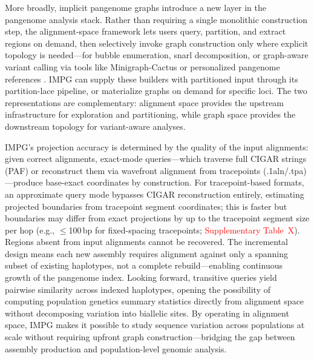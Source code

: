 
More broadly, implicit pangenome graphs introduce a new layer in the pangenome analysis stack. Rather than requiring a single monolithic construction step, the alignment-space framework lets users query, partition, and extract regions on demand, then selectively invoke graph construction only where explicit topology is needed---for bubble enumeration, snarl decomposition, or graph-aware variant calling via tools like Minigraph-Cactus \cite{Hickey2023} or personalized pangenome references \cite{Siren2024}. IMPG can supply these builders with partitioned input through its partition-lace pipeline, or materialize graphs on demand for specific loci. The two representations are complementary: alignment space provides the upstream infrastructure for exploration and partitioning, while graph space provides the downstream topology for variant-aware analyses.

IMPG's projection accuracy is determined by the quality of the input alignments: given correct alignments, exact-mode queries---which traverse full CIGAR strings (PAF) or reconstruct them via wavefront alignment from tracepoints (.1aln/.tpa)---produce base-exact coordinates by construction. For tracepoint-based formats, an approximate query mode bypasses CIGAR reconstruction entirely, estimating projected boundaries from tracepoint segment coordinates; this is faster but boundaries may differ from exact projections by up to the tracepoint segment size per hop (e.g., $\leq$100\,bp for fixed-spacing tracepoints; \textcolor{red}{Supplementary Table~X}). Regions absent from input alignments cannot be recovered. The incremental design means each new assembly requires alignment against only a spanning subset of existing haplotypes, not a complete rebuild---enabling continuous growth of the pangenome index. Looking forward, transitive queries yield pairwise similarity across indexed haplotypes, opening the possibility of computing population genetics summary statistics directly from alignment space without decomposing variation into biallelic sites. By operating in alignment space, IMPG makes it possible to study sequence variation across populations at scale without requiring upfront graph construction---bridging the gap between assembly production and population-level genomic analysis.

